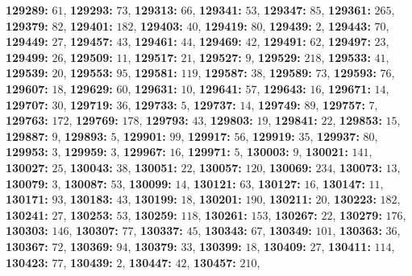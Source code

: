\textsf{\bfseries 129289:} $61$, \textsf{\bfseries 129293:} $73$, \textsf{\bfseries 129313:} $66$, \textsf{\bfseries 129341:} $53$, \textsf{\bfseries 129347:} $85$, \textsf{\bfseries 129361:} $265$, \textsf{\bfseries 129379:} $82$, \textsf{\bfseries 129401:} $182$, \textsf{\bfseries 129403:} $40$, \textsf{\bfseries 129419:} $80$, \textsf{\bfseries 129439:} $2$, \textsf{\bfseries 129443:} $70$, \textsf{\bfseries 129449:} $27$, \textsf{\bfseries 129457:} $43$, \textsf{\bfseries 129461:} $44$, \textsf{\bfseries 129469:} $42$, \textsf{\bfseries 129491:} $62$, \textsf{\bfseries 129497:} $23$, \textsf{\bfseries 129499:} $26$, \textsf{\bfseries 129509:} $11$, \textsf{\bfseries 129517:} $21$, \textsf{\bfseries 129527:} $9$, \textsf{\bfseries 129529:} $218$, \textsf{\bfseries 129533:} $41$, \textsf{\bfseries 129539:} $20$, \textsf{\bfseries 129553:} $95$, \textsf{\bfseries 129581:} $119$, \textsf{\bfseries 129587:} $38$, \textsf{\bfseries 129589:} $73$, \textsf{\bfseries 129593:} $76$, \textsf{\bfseries 129607:} $18$, \textsf{\bfseries 129629:} $60$, \textsf{\bfseries 129631:} $10$, \textsf{\bfseries 129641:} $57$, \textsf{\bfseries 129643:} $16$, \textsf{\bfseries 129671:} $14$, \textsf{\bfseries 129707:} $30$, \textsf{\bfseries 129719:} $36$, \textsf{\bfseries 129733:} $5$, \textsf{\bfseries 129737:} $14$, \textsf{\bfseries 129749:} $89$, \textsf{\bfseries 129757:} $7$, \textsf{\bfseries 129763:} $172$, \textsf{\bfseries 129769:} $178$, \textsf{\bfseries 129793:} $43$, \textsf{\bfseries 129803:} $19$, \textsf{\bfseries 129841:} $22$, \textsf{\bfseries 129853:} $15$, \textsf{\bfseries 129887:} $9$, \textsf{\bfseries 129893:} $5$, \textsf{\bfseries 129901:} $99$, \textsf{\bfseries 129917:} $56$, \textsf{\bfseries 129919:} $35$, \textsf{\bfseries 129937:} $80$, \textsf{\bfseries 129953:} $3$, \textsf{\bfseries 129959:} $3$, \textsf{\bfseries 129967:} $16$, \textsf{\bfseries 129971:} $5$, \textsf{\bfseries 130003:} $9$, \textsf{\bfseries 130021:} $141$, \textsf{\bfseries 130027:} $25$, \textsf{\bfseries 130043:} $38$, \textsf{\bfseries 130051:} $22$, \textsf{\bfseries 130057:} $120$, \textsf{\bfseries 130069:} $234$, \textsf{\bfseries 130073:} $13$, \textsf{\bfseries 130079:} $3$, \textsf{\bfseries 130087:} $53$, \textsf{\bfseries 130099:} $14$, \textsf{\bfseries 130121:} $63$, \textsf{\bfseries 130127:} $16$, \textsf{\bfseries 130147:} $11$, \textsf{\bfseries 130171:} $93$, \textsf{\bfseries 130183:} $43$, \textsf{\bfseries 130199:} $18$, \textsf{\bfseries 130201:} $190$, \textsf{\bfseries 130211:} $20$, \textsf{\bfseries 130223:} $182$, \textsf{\bfseries 130241:} $27$, \textsf{\bfseries 130253:} $53$, \textsf{\bfseries 130259:} $118$, \textsf{\bfseries 130261:} $153$, \textsf{\bfseries 130267:} $22$, \textsf{\bfseries 130279:} $176$, \textsf{\bfseries 130303:} $146$, \textsf{\bfseries 130307:} $77$, \textsf{\bfseries 130337:} $45$, \textsf{\bfseries 130343:} $67$, \textsf{\bfseries 130349:} $101$, \textsf{\bfseries 130363:} $36$, \textsf{\bfseries 130367:} $72$, \textsf{\bfseries 130369:} $94$, \textsf{\bfseries 130379:} $33$, \textsf{\bfseries 130399:} $18$, \textsf{\bfseries 130409:} $27$, \textsf{\bfseries 130411:} $114$, \textsf{\bfseries 130423:} $77$, \textsf{\bfseries 130439:} $2$, \textsf{\bfseries 130447:} $42$, \textsf{\bfseries 130457:} $210$, 
